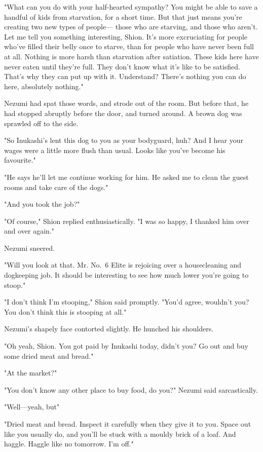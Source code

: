 "What can you do with your half-hearted sympathy? You might be able to
save a handful of kids from starvation, for a short time. But that just
means you're creating two new types of people--- those who are starving,
and those who aren't. Let me tell you something interesting, Shion. It's
more excruciating for people who've filled their belly once to starve,
than for people who have never been full at all. Nothing is more harsh
than starvation after satiation. These kids here have never eaten until
they're full. They don't know what it's like to be satisfied. That's why
they can put up with it. Understand? There's nothing you can do here,
absolutely nothing."

Nezumi had spat those words, and strode out of the room. But before
that, he had stopped abruptly before the door, and turned around. A
brown dog was sprawled off to the side.

"So Inukashi's lent this dog to you as your bodyguard, huh? And I hear
your wages were a little more flush than usual. Looks like you've become
his favourite."

"He says he'll let me continue working for him. He asked me to clean the
guest rooms and take care of the dogs."

"And you took the job?"

"Of course," Shion replied enthusiastically. "I was so happy, I thanked
him over and over again."

Nezumi sneered.

"Will you look at that. Mr. No.~6 Elite is rejoicing over a
housecleaning and dogkeeping job. It should be interesting to see how
much lower you're going to stoop."

"I don't think I'm stooping," Shion said promptly. "You'd agree,
wouldn't you? You don't think this is stooping at all."

Nezumi's shapely face contorted slightly. He hunched his shoulders.

"Oh yeah, Shion. You got paid by Inukashi today, didn't you? Go out and
buy some dried meat and bread."

"At the market?"

"You don't know any other place to buy food, do you?" Nezumi said
sarcastically.

"Well---yeah, but\el "

"Dried meat and bread. Inspect it carefully when they give it to you.
Space out like you usually do, and you'll be stuck with a mouldy brick
of a loaf. And haggle. Haggle like no tomorrow. I'm off."

